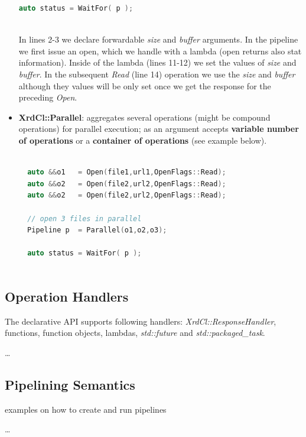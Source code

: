 \documentclass{article}
\begin{document}
\begin{itemize}
\begin{lstlisting}[language=C++, xleftmargin=\dimexpr-\leftmargini]
  auto status = WaitFor( p );
  
\end{lstlisting}
	            In lines 2-3 we declare forwardable \textit{size} and \textit{buffer} arguments. In the pipeline we first issue an open, which we handle
	            with a lambda (open returns also stat information). Inside of the lambda (lines 11-12) we set the values of \textit{size} and \textit{buffer}.
	            In the subsequent \textit{Read} (line 14) operation we use the \textit{size} and \textit{buffer} although they values will be only set once
	            we get the response for the preceding \textit{Open}. 
		  
		  \item \textbf{XrdCl::Parallel}: aggregates several operations (might be compound operations) for parallel execution; as an argument accepts \textbf{variable 
		  		number of operations} or a \textbf{container of operations} (see example below).
	  		
\begin{lstlisting}[language=C++, xleftmargin=\dimexpr-\leftmargini]
		
  auto &&o1   = Open(file1,url1,OpenFlags::Read);
  auto &&o2   = Open(file2,url2,OpenFlags::Read);
  auto &&o2   = Open(file2,url2,OpenFlags::Read);
  
  // open 3 files in parallel
  Pipeline p  = Parallel(o1,o2,o3);
  
  auto status = WaitFor( p );
  
\end{lstlisting}

		\end{itemize}
		
	\subsection{Operation Handlers}
	
		The declarative API supports following handlers: \textit{XrdCl::ResponseHandler}, functions, function objects, lambdas, \textit{std::future} and \textit{std::packaged_task}.

		\ldots	
	
	\subsection{Pipelining Semantics}
	
	examples on how to create and run pipelines
	
	\ldots
	
\end{document}
